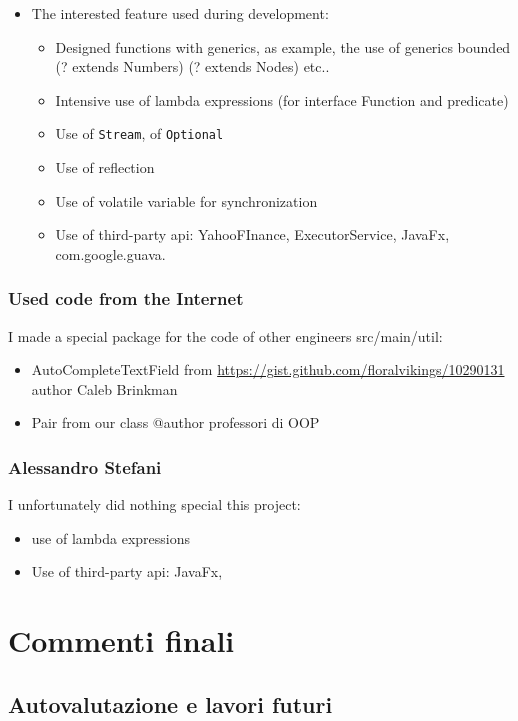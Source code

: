 \documentclass[a4paper,12pt]{report}
\begin{document}
\begin{itemize}
    \item The interested feature used during development:
    \begin{itemize}
        \item Designed functions with generics, as example, the use of generics bounded (? extends Numbers) (? extends Nodes) etc..
        \item Intensive use of lambda expressions (for interface Function and predicate)
        \item Use of \texttt{Stream}, of \texttt{Optional} 
        \item Use of reflection
        \item Use of volatile variable for synchronization
        \item Use of third-party api: YahooFInance, ExecutorService, JavaFx, com.google.guava.
    \end{itemize}
\end{itemize}

\subsection*{Used code from the Internet}

I made a special package for the code of other engineers src/main/util:
\begin{itemize}
    \item AutoCompleteTextField from \url{https://gist.github.com/floralvikings/10290131} author Caleb Brinkman
    \item Pair from our class @author professori di OOP 
\end{itemize}

\subsection{Alessandro Stefani}
I unfortunately did nothing special this project:
\begin{itemize}
    \item use of lambda expressions
    \item Use of third-party api: JavaFx,
\end{itemize}


\chapter{Commenti finali}

\section{Autovalutazione e lavori futuri}
\end{document}
